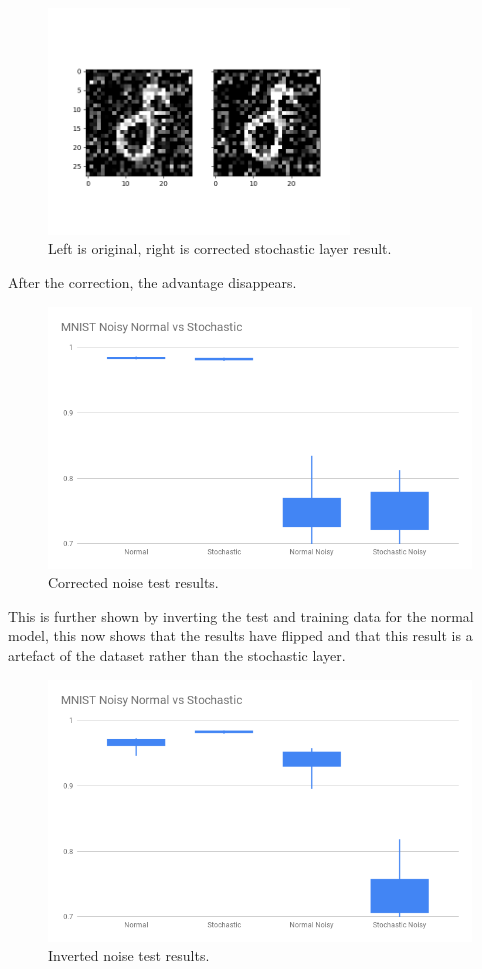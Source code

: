 \documentclass[a4paper,oneside,phd,etd]{BYUPhys}
\begin{document}
\begin{figure}[H]
\centering
\includegraphics[width=8cm]{results/stochastic_layer_pass_corrected.png}
\caption{Left is original, right is corrected stochastic layer result.}
\label{fig:noise_stochastic}
\end{figure}

After the correction, the advantage disappears.
\begin{figure}[H]
\centering
\includegraphics[width=12cm]{results/bitsize_corrected.png}
\caption{Corrected noise test results.}
\label{fig:noise_corrected}
\end{figure}

This is further shown by inverting the test and training data for the normal model, this now shows that the results have flipped and that this result is a artefact of the dataset rather than the stochastic layer.
\begin{figure}[H]
\centering
\includegraphics[width=12cm]{results/normal_inverted.png}
\caption{Inverted noise test results.}
\label{fig:noise_normal_inverted}
\end{figure}
\end{document}
